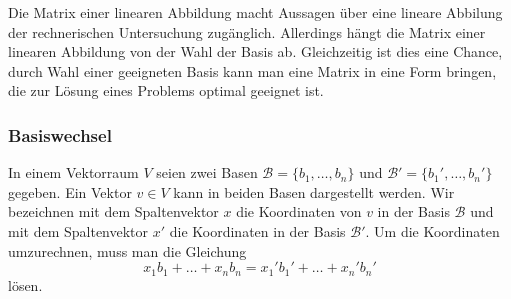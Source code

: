 Die Matrix einer linearen Abbildung macht Aussagen über eine lineare
Abbilung der rechnerischen Untersuchung zugänglich.
Allerdings hängt die Matrix einer linearen Abbildung von der Wahl der
Basis ab.
Gleichzeitig ist dies eine Chance, durch Wahl einer geeigneten Basis
kann man eine Matrix in eine Form bringen, die zur Lösung eines
Problems optimal geeignet ist.

\subsubsection{Basiswechsel}
In einem Vektorraum $V$ seien zwei Basen $\mathcal{B}=\{b_1,\dots,b_n\}$
und $\mathcal{B}'=\{b_1',\dots,b_n'\}$ gegeben.
Ein Vektor $v\in V$ kann in beiden Basen dargestellt werden.
Wir bezeichnen mit dem Spaltenvektor $x$ die Koordinaten von $v$ in der
Basis $\mathcal{B}$ und mit dem Spaltenvektor $x'$ die Koordinaten
in der Basis $\mathcal{B}'$.
Um die Koordinaten umzurechnen, muss man die Gleichung
\begin{equation}
x_1b_1 + \dots + x_nb_n = x_1'b_1' + \dots + x_n'b_n'
\label{buch:vektoren-und-matrizen:eqn:basiswechselgleichung}
\end{equation}
lösen.

